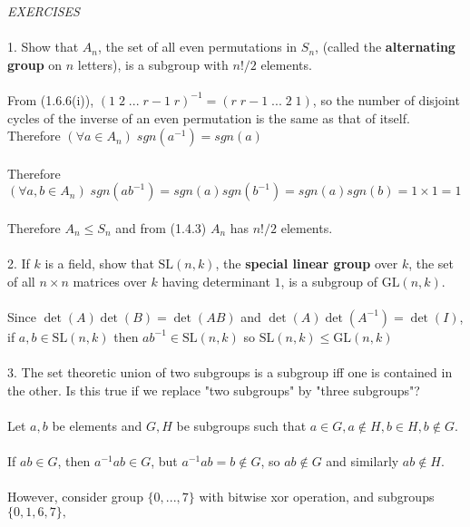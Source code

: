 \documentclass{article}
\begin{document}
\begin{siderules}\color{blue}\textit{EXERCISES}\color{black}\\\\
\color{blue}1. Show that \(A_{n}\), the set of all even permutations in \(S_{n}\), (called the \textbf{alternating group} on \(n\) letters),  
is a subgroup with \(n!/2\) elements.\\\\\color{black}
\null\qquad From \color{gray}(1.6.6(i))\color{black}, \((1\;2\;...\;r-1\;r)^{-1}=(r\;r-1\;...\;2\;1)\), so the 
number of disjoint cycles of the inverse of an even permutation is the same as that of itself. Therefore \((\forall a\in A_{n})\;sgn(a^{-1})=sgn(a)\)\\\\
\null\qquad Therefore \((\forall a,b\in A_{n})\;sgn(ab^{-1})=sgn(a)sgn(b^{-1})=sgn(a)sgn(b)=1\times 1=1\)\\\\
\null\qquad Therefore \(A_{n}\le S_{n}\) and from \color{gray}(1.4.3) \color{black} \(A_{n}\) has \(n!/2\) elements.\\\\
\color{blue}2. If \(k\) is a field, show that \(\mathrm{SL}(n, k)\), the \textbf{special linear group} over \(k\), the set of all \(n\times n\) 
matrices over \(k\) having determinant \(1\), is a subgroup of \(\mathrm{GL}(n, k)\).\color{black}\\\\
\null\qquad Since \(\det(A)\det(B)=\det(AB)\) and \(\det(A)\det(A^{-1})=\det(I)\),\\
\null\qquad if \(a,b\in\mathrm{SL}(n,k)\) then \(ab^{-1}\in\mathrm{SL}(n,k)\) so \(\mathrm{SL}(n,k)\le\mathrm{GL}(n,k)\)\\\\
\color{blue}3. The set theoretic union of two subgroups is a subgroup iff one is 
contained in the other. Is this true if we replace "two subgroups" by "three subgroups"?\\\\\color{black}
\null\qquad Let \(a,b\) be elements and \(G,H\) be subgroups such that \(a\in G,a\notin H,b\in H,b\notin G\).\\\\
\null\qquad If \(ab\in G\), then \(a^{-1}ab\in G\), but \(a^{-1}ab=b\notin G\), so \(ab\notin G\) and similarly \(ab\notin H\).\\\\ 
\null\qquad However, consider group \(\{0,...,7\}\) with bitwise xor operation, and subgroups \(\{0,1,6,7\},\)\\\\

\end{siderules}
\end{document}
